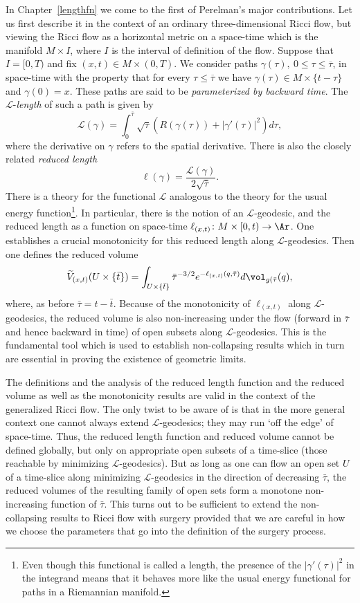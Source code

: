 In Chapter~\ref{lengthfn} we come to
the first of Perelman's major contributions. Let us first describe
it in the context of an ordinary three-dimensional Ricci flow, but
viewing the Ricci flow as a horizontal metric on a space-time which
is the manifold $M\times I$, where $I$ is the interval of definition
of the flow. Suppose that $I=[0,T)$ and fix $(x,t)\in M\times
(0,T)$. We consider paths $\gamma(\tau),\ 0\le \tau\le
\overline\tau$, in space-time with the property that for every
$\tau\le \overline\tau$ we have $\gamma(\tau)\in M\times \{t-\tau\}$
and $\gamma(0)=x$. These paths are said to be {\em parameterized by
backward time}.  The ${\mathcal
L}$-{\em length} of such a path is given by
$${\mathcal L}(\gamma)=\int_0^{\overline
\tau}\sqrt{\tau}\left(R(\gamma(\tau))+|\gamma'(\tau)|^2\right)d\tau,$$
where the derivative on $\gamma$ refers to the spatial derivative.
There is also the closely related {\em reduced length}
$$\ell(\gamma)=\frac{{\mathcal L}(\gamma)}{2\sqrt{\overline\tau}}.$$
There is a theory for the functional ${\mathcal L}$ analogous to the
theory for the usual energy function\footnote{Even though this
functional is called a length, the presence of the
$|\gamma'(\tau)|^2$ in the integrand means that it behaves more like
the usual energy functional for paths in a Riemannian manifold.}.
 In
particular, there is the notion of an ${\mathcal
L}$-geodesic, and the reduced length
as a function on space-time $\ell_{(x,t)}\colon M\times [0,t)\to
\Ar$. One establishes a crucial monotonicity for this reduced length along ${\mathcal
L}$-geodesics. Then one defines the reduced volume
$$\widetilde
V_{(x,t)}(U\times\{\bar t\})=\int_{U\times\{\bar
t\}}\bar\tau^{-3/2}e^{-\ell_{(x,t)}(q,\bar\tau)}d\vol_{g(\bar\tau}(q),$$ where, as before $\bar\tau=t-\bar t$.
Because of the monotonicity of $\ell_{(x,t)}$ along ${\mathcal
L}$-geodesics, the reduced volume is also
non-increasing under the flow (forward in $\bar\tau$ and hence
backward in time) of open subsets along ${\mathcal L}$-geodesics.
This is the fundamental tool which is used to establish
non-collapsing results which in turn are essential in proving the
existence of geometric limits.







The definitions and the analysis of the reduced length function and
the reduced volume as well as the monotonicity results are valid in
the context of the generalized Ricci flow. The only twist to be
aware of is that in the more general context one cannot always
extend ${\mathcal L}$-geodesics; they may run `off the edge' of
space-time. Thus, the reduced length function and reduced volume
cannot be defined globally, but only on appropriate open subsets of
a time-slice (those reachable by minimizing ${\mathcal
L}$-geodesics). But as long as one can flow an open set $U$ of a
time-slice along minimizing ${\mathcal L}$-geodesics in the
direction of decreasing $\bar\tau$, the reduced volumes of the
resulting family of open sets form a monotone non-increasing
function of $\bar\tau$. This turns out to be sufficient to extend
the non-collapsing results to Ricci flow with surgery provided that
we are careful in how we choose the parameters that go into the
definition of the surgery process.

